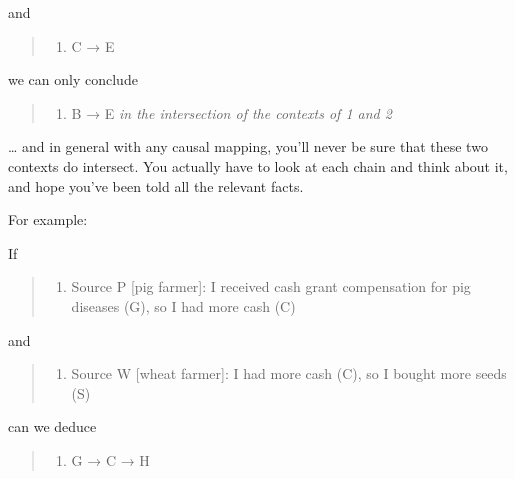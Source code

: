 \documentclass[
]{book}
\providecommand{\tightlist}{%
  \setlength{\itemsep}{0pt}\setlength{\parskip}{0pt}}
\begin{document}
and

\begin{quote}
\begin{enumerate}
\def\labelenumi{\arabic{enumi})}
\setcounter{enumi}{1}
\tightlist
\item
  C → E
\end{enumerate}
\end{quote}

we can only conclude

\begin{quote}
\begin{enumerate}
\def\labelenumi{\arabic{enumi})}
\setcounter{enumi}{2}
\tightlist
\item
  B → E \emph{in the intersection of the contexts of 1 and 2}
\end{enumerate}
\end{quote}

\ldots{} and in general with any causal mapping, you'll never be sure that these two contexts do intersect. You actually have to look at each chain and think about it, and hope you've been told all the relevant facts.

For example:

If

\begin{quote}
\begin{enumerate}
\def\labelenumi{\arabic{enumi})}
\tightlist
\item
  Source P {[}pig farmer{]}: I received cash grant compensation for pig diseases (G), so I had more cash (C)
\end{enumerate}
\end{quote}

and

\begin{quote}
\begin{enumerate}
\def\labelenumi{\arabic{enumi})}
\setcounter{enumi}{1}
\tightlist
\item
  Source W {[}wheat farmer{]}: I had more cash (C), so I bought more seeds (S)
\end{enumerate}
\end{quote}

can we deduce

\begin{quote}
\begin{enumerate}
\def\labelenumi{\arabic{enumi})}
\setcounter{enumi}{2}
\tightlist
\item
  G → C → H
\end{enumerate}
\end{quote}
\end{document}
